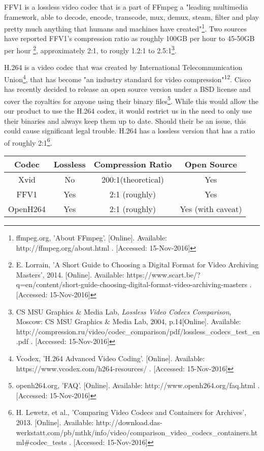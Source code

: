 \documentclass[letterpaper,10pt,onecolumn,draftclsnofoot]{IEEEtran}
\begin{document}
FFV1 is a lossless video codec that is a part of FFmpeg a "leading multimedia framework, able to decode, encode, transcode, mux, demux, steam, filter and play pretty much anything that humans and machines have created"\footnote{ffmpeg.org, 'About FFmpeg'. [Online]. Available: http://ffmpeg.org/about.html . [Accessed: 15-Nov-2016] }. %
Two sources have reported FFV1's compression ratio as roughly 100GB per hour to 45-50GB per hour \footnote{E. Lorrain, 'A Short Guide to Choosing a Digital Format for Video Archiving Masters', 2014. [Online]. Available: https://www.scart.be/?q=en/content/short-guide-choosing-digital-format-video-archiving-masters . [Accessed: 15-Nov-2016] }, approximately 2:1, to rougly 1.2:1 to 2.5:1\footnote{CS MSU Graphics \& Media Lab, \textit{Lossless Video Codecs Comparison}, Moscow: CS MSU Graphics \& Media Lab, 2004, p.14[Online]. Available: http://compression.ru/video/codec\_comparison/pdf/lossless\_codecs\_test\_en.pdf . [Accessed: 15-Nov-2016] }. %

H.264 is a video codec that was created by International Telecommunication Union\footnote{Vcodex, 'H.264 Advanced Video Coding'. [Online]. Available: https://www.vcodex.com/h264-resources/ . [Accessed: 15-Nov-2016] }, that has become "an industry standard for video compression"\textsuperscript{12}. %
Cisco has recently decided to release an open source version under a BSD license and cover the royalties for anyone using their binary files\footnote{openh264.org, 'FAQ'. [Online]. Available: http://www.openh264.org/faq.html . [Accessed: 15-Nov-2016] }. %
While this would allow the our product to use the H.264 codex, it would restrict us in the need to only use their binaries and always keep them up to date.
Should their be an issue, this could cause significant legal trouble.
H.264 has a lossless version that has a ratio of roughly 2:1\footnote{H. Lewetz, et al., 'Comparing Video Codecs and Containers for Archives', 2013. [Online]. Available: http://download.das-werkstatt.com/pb/mthk/info/video/comparison\_video\_codecs\_containers.html\#codec\_tests . [Accessed: 15-Nov-2016] }. %

\begin{tabular}{|c|c|c|c|}
	\hline
	\textbf{Codec} & \textbf{Lossless} & \textbf{Compression Ratio} & \textbf{Open Source} \\
	\hline
	Xvid & No & 200:1(theoretical) & Yes \\
	\hline
	FFV1 & Yes & 2:1 (roughly) & Yes \\
	\hline
	 OpenH264 & Yes & 2:1 (roughly) & Yes (with caveat) \\
	\hline
	
\end{tabular}
\end{document}
